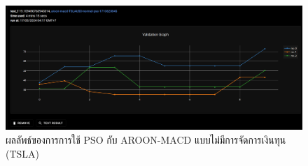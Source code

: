 \begin{figure}[ht]
    \centering
    \includegraphics[width=\textwidth]{images/pso/aroon-macd/tsla-normal.png}
    \caption{ผลลัพธ์ของการการใช้ PSO กับ AROON-MACD แบบไม่มีการจัดการเงินทุน (TSLA)}
\end{figure}

